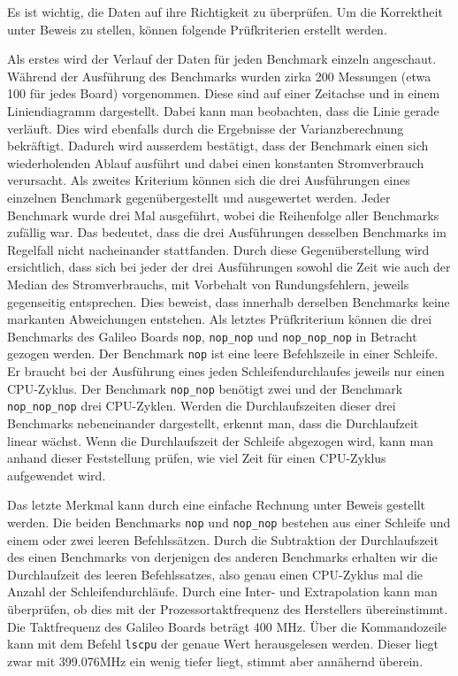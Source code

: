 Es ist wichtig, die Daten auf ihre Richtigkeit zu überprüfen. Um die Korrektheit unter Beweis zu stellen, können folgende Prüfkriterien erstellt werden.
\par
Als erstes wird der Verlauf der Daten für jeden Benchmark einzeln angeschaut. Während der Ausführung des Benchmarks wurden zirka 200 Messungen (etwa 100 für jedes Board) vorgenommen. Diese sind auf einer Zeitachse und in einem Liniendiagramm dargestellt. Dabei kann man beobachten, dass die Linie gerade verläuft. Dies wird ebenfalls durch die Ergebnisse der Varianzberechnung bekräftigt. Dadurch wird ausserdem bestätigt, dass der Benchmark einen sich wiederholenden Ablauf ausführt und dabei einen konstanten Stromverbrauch verursacht. Als zweites Kriterium können sich die drei Ausführungen eines einzelnen Benchmark gegenübergestellt und ausgewertet werden. Jeder Benchmark wurde drei Mal ausgeführt, wobei die Reihenfolge aller Benchmarks zufällig war. Das bedeutet, dass die drei Ausführungen desselben Benchmarks im Regelfall nicht nacheinander stattfanden. Durch diese Gegenüberstellung wird ersichtlich, dass sich bei jeder der drei Ausführungen sowohl die Zeit wie auch der Median des Stromverbrauchs, mit Vorbehalt von Rundungsfehlern, jeweils gegenseitig entsprechen. Dies beweist, dass innerhalb derselben Benchmarks keine markanten Abweichungen entstehen. Als letztes Prüfkriterium können die drei Benchmarks des Galileo Boards \texttt{nop}, \texttt{nop\_nop} und \texttt{nop\_nop\_nop} in Betracht gezogen werden. Der Benchmark \texttt{nop} ist eine leere Befehlszeile in einer Schleife. Er braucht bei der Ausführung eines jeden Schleifendurchlaufes jeweils nur einen CPU-Zyklus. Der Benchmark \texttt{nop\_nop} benötigt zwei und der Benchmark \texttt{nop\_nop\_nop} drei CPU-Zyklen. Werden die Durchlaufszeiten dieser drei Benchmarks nebeneinander dargestellt, erkennt man, dass die Durchlaufzeit linear wächst. Wenn die Durchlaufszeit der Schleife abgezogen wird, kann man anhand dieser Feststellung prüfen, wie viel Zeit für einen CPU-Zyklus aufgewendet wird.
\par
Das letzte Merkmal kann durch eine einfache Rechnung unter Beweis gestellt werden. Die beiden Benchmarks \texttt{nop} und \texttt{nop\_nop} bestehen aus einer Schleife und einem oder zwei leeren Befehlssätzen. Durch die Subtraktion der Durchlaufszeit des einen Benchmarks von derjenigen des anderen Benchmarks erhalten wir die Durchlaufzeit des leeren Befehlssatzes, also genau einen CPU-Zyklus mal die Anzahl der Schleifendurchläufe. Durch eine Inter- und Extrapolation kann man überprüfen, ob dies mit der Prozessortaktfrequenz des Herstellers übereinstimmt. Die Taktfrequenz des Galileo Boards beträgt 400 MHz. Über die Kommandozeile kann mit dem Befehl \texttt{lscpu} der genaue Wert herausgelesen werden. Dieser liegt zwar mit 399.076MHz ein wenig tiefer liegt, stimmt aber annähernd überein.

